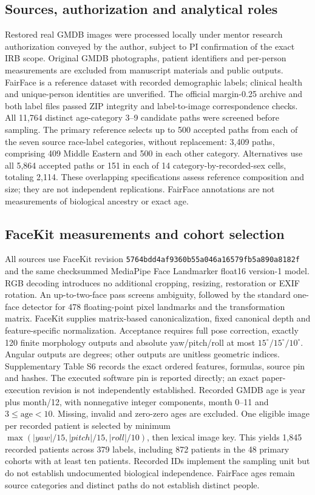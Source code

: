 \documentclass[11pt]{article}
\begin{document}
\subsection{Sources, authorization and analytical roles}
Restored real GMDB images were processed locally under mentor research authorization conveyed by the author, subject to PI confirmation of the exact IRB scope. Original GMDB photographs, patient identifiers and per-person measurements are excluded from manuscript materials and public outputs. FairFace is a reference dataset with recorded demographic labels; clinical health and unique-person identities are unverified. The official margin-0.25 archive and both label files passed ZIP integrity and label-to-image correspondence checks. All 11,764 distinct age-category 3--9 candidate paths were screened before sampling.
The primary reference selects up to 500 accepted paths from each of the seven source race-label categories, without replacement: 3,409 paths, comprising 409 Middle Eastern and 500 in each other category. Alternatives use all 5,864 accepted paths or 151 in each of 14 category-by-recorded-sex cells, totaling 2,114. These overlapping specifications assess reference composition and size; they are not independent replications. FairFace annotations are not measurements of biological ancestry or exact age.
\subsection{FaceKit measurements and cohort selection}
All sources use FaceKit revision \texttt{5764bdd4af9360b55a046a16579fb5a890a8182f} and the same checksummed MediaPipe Face Landmarker float16 version-1 model. RGB decoding introduces no additional cropping, resizing, restoration or EXIF rotation. An up-to-two-face pass screens ambiguity, followed by the standard one-face detector for 478 floating-point pixel landmarks and the transformation matrix. FaceKit supplies matrix-based canonicalization, fixed canonical depth and feature-specific normalization. Acceptance requires full pose correction, exactly 120 finite morphology outputs and absolute yaw/pitch/roll at most $15^\circ/15^\circ/10^\circ$. Angular outputs are degrees; other outputs are unitless geometric indices. Supplementary Table S6 records the exact ordered features, formulas, source pin and hashes. The executed software pin is reported directly; an exact paper-execution revision is not independently established.
Recorded GMDB age is year plus month/12, with nonnegative integer components, month 0--11 and $3\leq\mathrm{age}<10$. Missing, invalid and zero-zero ages are excluded. One eligible image per recorded patient is selected by minimum $\max(|yaw|/15,|pitch|/15,|roll|/10)$, then lexical image key. This yields 1,845 recorded patients across 379 labels, including 872 patients in the 48 primary cohorts with at least ten patients. Recorded IDs implement the sampling unit but do not establish undocumented biological independence. FairFace ages remain source categories and distinct paths do not establish distinct people.
\end{document}
